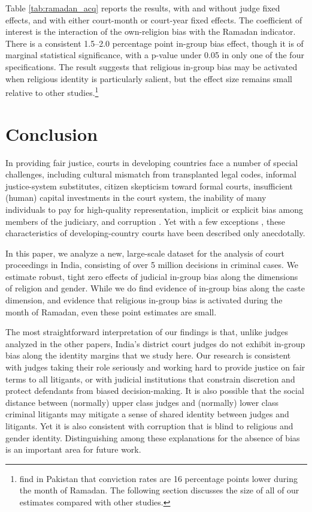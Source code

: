 \documentclass[12pt,english]{article}
\begin{document}
Table \ref{tab:ramadan_acq} reports the results, with and without judge fixed effects, and with either court-month or court-year fixed effects. The coefficient of interest is the interaction of the own-religion bias with the Ramadan indicator. There is a consistent 1.5--2.0 percentage point in-group bias effect, though it is of marginal statistical significance, with a p-value under 0.05 in only one of the four specifications. The result suggests that religious in-group bias may be activated when religious identity is particularly salient, but the effect size remains small relative to other studies.\footnote{\citet{Mehmood2020} find in Pakistan that conviction rates are 16 percentage points lower during the month of Ramadan. The following section discusses the size of all of our estimates compared with other studies.}

\section{Conclusion}
\label{sec:conc}

In providing fair justice, courts in developing countries face a number of special challenges, including cultural mismatch from transplanted legal codes, informal justice-system substitutes, citizen skepticism toward formal courts, insufficient (human) capital investments in the court system, the inability of many individuals to pay for high-quality representation, implicit or explicit bias among members of the judiciary, and corruption \citep{DjankovLaPortaLopez-de-SilanesShleifer2003QJoE,LaPortaLopez-de-SilanesShleifer2008JoEL}. Yet with a few exceptions \citep[for example]{PonticelliAlencar2016TQJoE}, these characteristics of developing-country courts have been described only anecdotally. 

In this paper, we analyze a new, large-scale dataset for the analysis of court proceedings in India, consisting of over 5 million decisions in criminal cases. We estimate robust, tight zero effects of judicial in-group bias along the dimensions of religion and gender. While we do find evidence of in-group bias along the caste dimension, and evidence that religious in-group bias is activated during the month of Ramadan, even these point estimates are small.

The most straightforward interpretation of our findings is that, unlike judges analyzed in the other papers, India's district court judges do not exhibit in-group bias along the identity margins that we study here. Our research is consistent with judges taking their role seriously and working hard to provide justice on fair terms to all litigants, or with judicial institutions that constrain discretion and protect defendants from biased decision-making. It is also possible that the social distance between (normally) upper class judges and (normally) lower class criminal litigants may mitigate a sense of shared identity between judges and litigants. Yet it is also consistent with corruption that is blind to religious and gender identity. Distinguishing among these explanations for the absence of bias is an important area for future work.
\end{document}
